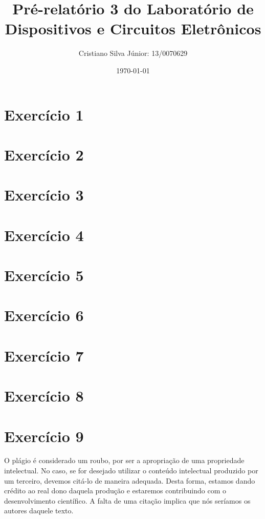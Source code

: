 \documentclass[12pt, a4paper, twoside]{article}
\begin{document}
\title{Pré-relatório 3 do Laboratório de Dispositivos e Circuitos Eletrônicos}
\author{Cristiano Silva Júnior: 13/0070629}
\date{\today}
\maketitle

\section{Exercício 1}

\section{Exercício 2}

\section{Exercício 3}

\section{Exercício 4}

\section{Exercício 5}

\section{Exercício 6}

\section{Exercício 7}

\section{Exercício 8}

\section{Exercício 9}

O plágio é considerado um roubo, por ser a apropriação de uma propriedade intelectual.
No caso, se for desejado utilizar o conteúdo intelectual produzido por um terceiro,
devemos citá-lo de maneira adequada. Desta forma, estamos dando crédito ao real dono
daquela produção e estaremos contribuindo com o desenvolvimento científico. A falta de
uma citação implica que nós seríamos os autores daquele texto.
\end{document}
